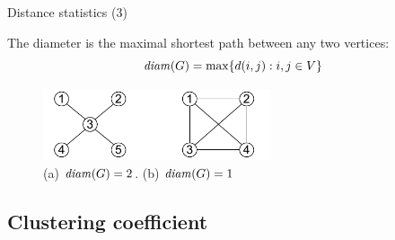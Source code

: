 \begin{frame}{Distance statistics (3)}

\begin{definition}[Diameter]
The \alert{diameter} is the maximal shortest path between any two vertices:
\[
  \mathit{diam}(G) = \max \{ d(i,j) : i,j \in V \}
\]
\end{definition}

\begin{figure}
\includegraphics[width=0.6\textwidth]{figs/08/diameter}
\caption{(a) $\mathit{diam}(G) = 2$. (b) $\mathit{diam}(G) = 1$}
\end{figure}

\end{frame}

\subsection{Clustering coefficient}

